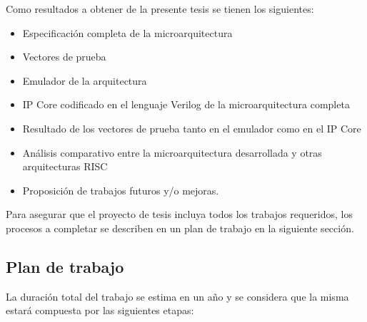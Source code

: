\documentclass[a4paper]{article}
\begin{document}
Como resultados a obtener de la presente tesis se tienen los siguientes:

\begin{itemize}
    \item Especificación completa de la microarquitectura
    \item Vectores de prueba
    \item Emulador de la arquitectura
    \item IP Core codificado en el lenguaje Verilog de la microarquitectura completa
    \item Resultado de los vectores de prueba tanto en el emulador como en el IP Core
    \item Análisis comparativo entre la microarquitectura desarrollada y otras arquitecturas RISC
    \item Proposición de trabajos futuros y/o mejoras.
\end{itemize}

Para asegurar que el proyecto de tesis incluya todos los trabajos requeridos, los procesos a completar se describen en un plan de trabajo en la siguiente sección.

\newpage

\subsection{Plan de trabajo}


La duración total del trabajo se estima en un año y se considera que la misma estará compuesta por las siguientes etapas:
\end{document}
